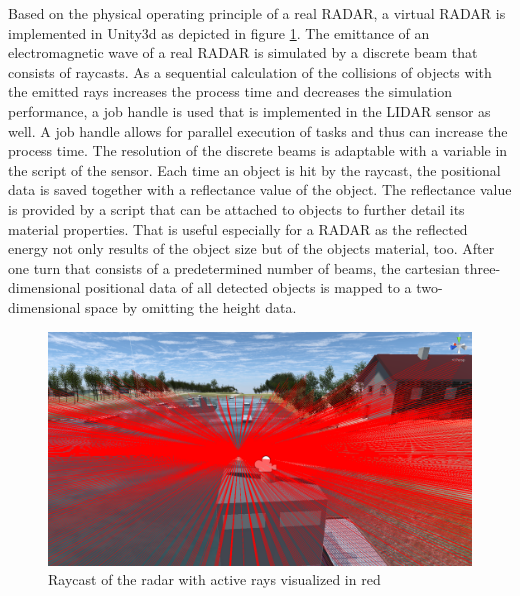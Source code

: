 Based on the physical operating principle of a real \ac{RADAR}, a virtual \ac{RADAR} is implemented in Unity3d as depicted in figure \ref{fig_radarrays}. The emittance of an electromagnetic wave of a real \ac{RADAR} is simulated by a discrete beam that consists of raycasts. As a sequential calculation of the collisions of objects with the emitted rays increases the process time and decreases the simulation performance, a job handle is used that is implemented in the \ac{LIDAR} sensor as well. A job handle allows for parallel execution of tasks and thus can increase the process time. The resolution of the discrete beams is adaptable with a variable in the script of the sensor. Each time an object is hit by the raycast, the positional data is saved together with a reflectance value of the object. The reflectance value is provided by a script that can be attached to objects to further detail its  material properties. That is useful especially for a \ac{RADAR} as the reflected energy not only results of the object size but of the objects material, too. After one turn that consists of a predetermined number of beams, the cartesian three-dimensional positional data of all detected objects is mapped to a two-dimensional space by omitting the height data.\\
\begin{figure}
	\begin{centering}
		\centering
		\includegraphics[width=0.6\linewidth]{Bilder/radarrays.png}
		\caption{Raycast of the radar with active rays visualized  in red}
		\label{fig_radarrays}
	\end{centering}
\end{figure}

